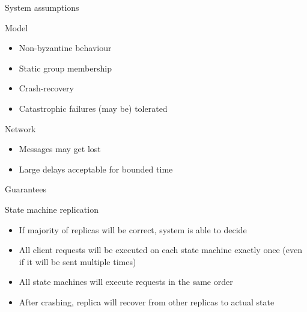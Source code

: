 \documentclass[hyperref={pdfpagelabels=true},11pt,compress,trans]{beamer}
\begin{document}
\begin{frame}{System assumptions}
  \begin{block}{Model}
    \vspace{-1em}\vspace{-\parskip}\vspace{-\lineskip}
    \begin{itemize}
      \item Non-byzantine behaviour
      \item Static group membership
      \item Crash-recovery
      \item Catastrophic failures (may be) tolerated
     \end{itemize}
  \end{block}

  \begin{block}{Network}
    \vspace{-1em}\vspace{-\parskip}\vspace{-\lineskip}
    \begin{itemize}
      \item Messages may get lost
      \item Large delays acceptable for bounded time
    \end{itemize}
  \end{block}
\end{frame}

\begin{frame}{Guarantees}
  \begin{block}{State machine replication}
    \vspace{-1em}\vspace{-\parskip}\vspace{-\lineskip}
    \begin{itemize}
      \item If majority of replicas will be correct, system is able to decide
      \item All client requests will be executed on each state machine exactly once (even if it will be sent multiple times)
      \item All state machines will execute requests in the same order
      \item After crashing, replica will recover from other replicas to actual state
    \end{itemize}
  \end{block}
\end{frame}
\end{document}
